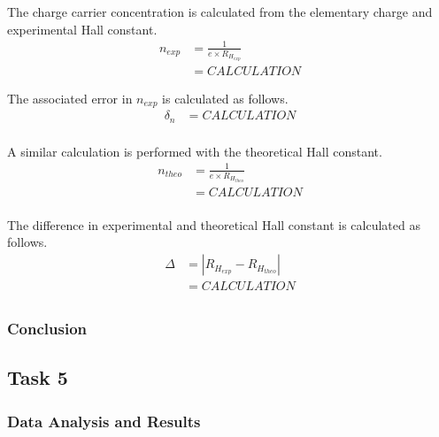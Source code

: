 \documentclass[a4paper]{article}
\begin{document}



\qq The charge carrier concentration is calculated from the elementary
charge and experimental Hall constant.
\begin{align*}
n_{exp} &= \frac{1}{e \times R_{H_{exp}}} \\
	&= CALCULATION 
\end{align*}

The associated error in $n_{exp}$ is calculated as follows.
\begin{align*}
\delta_n &= CALCULATION \\
\end{align*}

A similar calculation is performed with the theoretical Hall constant.
\begin{align*}
n_{theo} &= \frac{1}{e \times R_{H_{theo}}} \\
	&= CALCULATION \\
\end{align*}

The difference in experimental and theoretical Hall constant is calculated as follows.
\begin{align*}
\Delta &= | R_{H_{exp}} - R_{H_{theo}} | \\
	   &= CALCULATION \\
\end{align*}


\subsubsection{Conclusion}

\subsection{Task 5}

\subsubsection{Data Analysis and Results}
\end{document}
